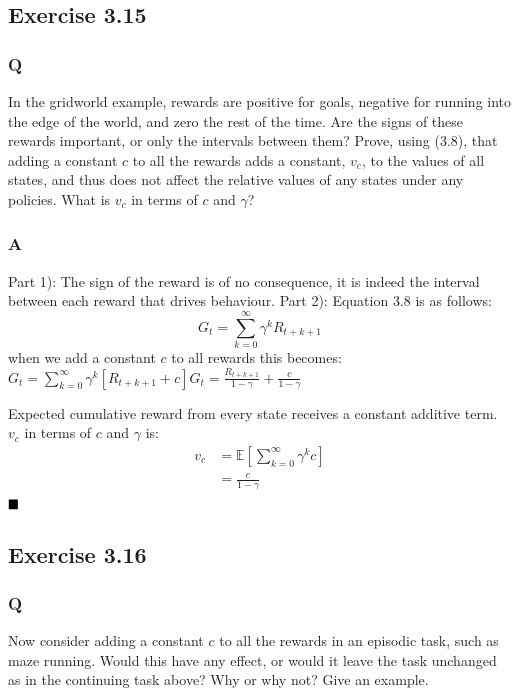 \subsection{Exercise 3.15}
\subsubsection*{Q}
In the gridworld example, rewards are positive for goals, negative for running into the edge of the world, and zero the rest of the time. Are the signs of these rewards important, or only the intervals between them? Prove, using (3.8), that adding a constant $c$ to all the rewards adds a constant, $v_c$, to the values of all states, and thus does not affect the relative values of any states under any policies. What is $v_c$ in terms of $c$ and $\gamma$? 

\subsubsection*{A}
Part 1): The sign of the reward is of no consequence, it is indeed the interval between each reward that drives behaviour.
Part 2): Equation 3.8 is as follows:
\begin{equation}
G_t = \sum_{k=0}^{\infty} \gamma^k R_{t+k+1}
\end{equation}
when we add a constant $c$ to all rewards this becomes:
$
G_t = \sum_{k=0}^{\infty} \gamma^k [R_{t+k+1} + c]
G_t = \frac{R_{t+k+1}}{1 - \gamma} + \frac{c}{1 - \gamma}
$

Expected cumulative reward from every state receives a constant additive term. \(v_c\) in terms of $c$ and $\gamma$ is:
\begin{align}
v_c &= \mathbb{E}\left[\sum_{k=0}^{\infty}\gamma^k c\right]\\
&= \frac{c}{1 - \gamma}\\
\end{align}
$
\hfill \blacksquare
$

\subsection{Exercise 3.16}
\subsubsection*{Q}
Now consider adding a constant $c$ to all the rewards in an episodic task, such as maze running. Would this have any effect, or would it leave the task unchanged as in the continuing task above? Why or why not? Give an example. 

